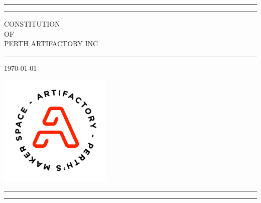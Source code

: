 \documentclass[12pt]{article}
\begin{document}

\begin{titlepage}
  

	\centering %
	
	
	\rule{\textwidth}{1pt} %
	
	\vspace{2pt}\vspace{-10mm} %
	
	\rule{\textwidth}{0.4pt} %
	
	\vspace{0.1\textheight} %
	
	
		{\Huge CONSTITUTION }\\[0.5\baselineskip] %
		{\Large OF}\\[0.5\baselineskip] %
		{\Huge PERTH ARTIFACTORY INC} %
	
	\vspace{0.025\textheight} %
	
	\rule{0.4\textwidth}{0.4pt} %
	
	\vspace{0.05\textheight} 
  \today
	\vspace{0.2\textheight}

  \includegraphics[width=0.4\textwidth]{Artifactory_logo_COMBO-ROUND_ORANGE.png}
 
  \vfill
	
	\rule{\textwidth}{0.4pt} %
	\vspace{2pt}\vspace{-10mm} %
	\rule{\textwidth}{1pt} %

\end{titlepage}
\end{document}
